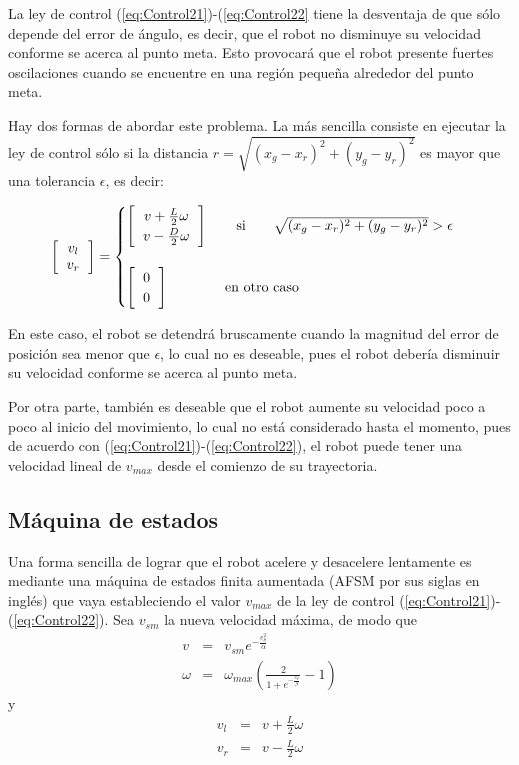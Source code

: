 \documentclass[letterpaper,12pt]{article}
\begin{document}
  
La ley de control (\ref{eq:Control21})-(\ref{eq:Control22} tiene la desventaja de que sólo depende del error de ángulo, es decir, que el robot no disminuye su velocidad conforme se acerca al punto meta. Esto provocará que el robot presente fuertes oscilaciones cuando se encuentre en una región pequeña alrededor del punto meta.

Hay dos formas de abordar este problema. La más sencilla consiste en ejecutar la ley de control sólo si la distancia $r=\sqrt{(x_g - x_r)^2 + (y_g - y_r)^2}$ es mayor que una tolerancia $\epsilon$, es decir:

\[
  \left[\begin{tabular}{c}$v_l$ \\ $v_r$ \end{tabular}\right] =
  \begin{cases}
    \left[
    \begin{tabular}{c}
      $v + \frac{L}{2}\omega$ \\
      $v - \frac{D}{2}\omega$
    \end{tabular}
  \right] \qquad \textrm{si} \qquad \sqrt{(x_g - x_r)^2 + (y_g - y_r)^2} > \epsilon \\
  \\
  \left[
    \begin{tabular}{c}$0$\\$0$\end{tabular}
  \right]  \qquad\qquad \textrm{en otro caso}
  \end{cases}
\]

En este caso, el robot se detendrá bruscamente cuando la magnitud del error de posición sea menor que $\epsilon$, lo cual no es deseable, pues el robot debería disminuir su velocidad conforme se acerca al punto meta.

Por otra parte, también es deseable que el robot aumente su velocidad poco a poco al inicio del movimiento, lo cual no está considerado hasta el momento, pues de acuerdo con (\ref{eq:Control21})-(\ref{eq:Control22}), el robot puede tener una velocidad lineal de $v_{max}$ desde el comienzo de su trayectoria.

\subsection{Máquina de estados}
Una forma sencilla de lograr que el robot acelere y desacelere lentamente es mediante una máquina de estados finita aumentada (AFSM por sus siglas en inglés) que vaya estableciendo el valor $v_{max}$ de la ley de control (\ref{eq:Control21})-(\ref{eq:Control22}). Sea $v_{sm}$ la nueva velocidad máxima, de modo que
\begin{eqnarray}
  v      &=& v_{sm}e^{-\frac{e_{\theta}^{2}}{\alpha}}\label{eq:NewControl1}\\
  \omega &=& \omega_{max}\left(\frac{2}{1+e^{-\frac{e_{\theta}}{\beta}}}-1\right)\label{eq:NewControl2}
\end{eqnarray}
y
\begin{eqnarray*}
  v_l &=& v + \frac{L}{2}\omega\\
  v_r &=& v - \frac{L}{2}\omega
\end{eqnarray*}
\end{document}
